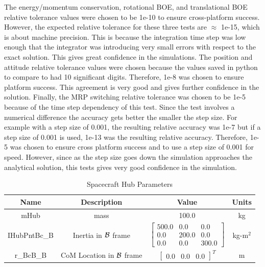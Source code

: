 The energy/momentum conservation, rotational BOE, and translational BOE relative tolerance values were chosen to be 1e-10 to ensure cross-platform success. However, the expected relative tolerance for these three tests are $\approx$ 1e-15, which is about machine precision. This is because the integration time step was low enough that the integrator was introducing very small errors with respect to the exact solution. This gives great confidence in the simulations. The position and attitude relative tolerance values were chosen because the values saved in python to compare to had 10 significant digits. Therefore, 1e-8 was chosen to ensure platform success. This agreement is very good and gives further confidence in the solution. Finally, the MRP switching relative tolerance was chosen to be 1e-5 because of the time step dependency of this test. Since the test involves a numerical difference the accuracy gets better the smaller the step size. For example with a step size of 0.001, the resulting relative accuracy was 1e-7 but if a step size of 0.001 is used, 1e-13 was the resulting relative accuracy. Therefore, 1e-5 was chosen to ensure cross platform success and to use a step size of 0.001 for speed. However, since as the step size goes down the simulation approaches the analytical solution, this tests gives very good confidence in the simulation. 

\begin{table}[htbp]
	\caption{Spacecraft Hub Parameters}
	\label{tab:hub}
	\centering \fontsize{10}{10}\selectfont
	\begin{tabular}{ c | c | c | c } %
		\hline
		\textbf{Name}  & \textbf{Description}  & \textbf{Value} & \textbf{Units} \\
		\hline
		mHub  & mass & 100.0 & kg \\
		IHubPntBc\_B & Inertia in $\cal{B}$ frame & $\begin{bmatrix}
		500.0 & 0.0 & 0.0\\
		0.0 & 200.0 & 0.0\\
		0.0 & 0.0 & 300.0
		\end{bmatrix}$ & kg-m$^2$ \\
		r\_BcB\_B & CoM Location in $\cal{B}$ frame & $\begin{bmatrix}
		0.0 & 0.0 & 0.0 \end{bmatrix}^T$ & m \\
		\hline
	\end{tabular}
\end{table}

